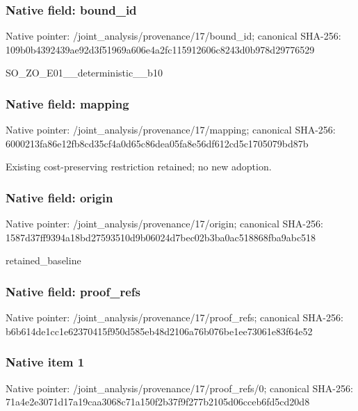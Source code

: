 \documentclass[10pt,a4paper]{article}
\begin{document}
\subsubsection{Native field: bound\_\allowbreak{}id}
Native pointer: /joint\_\allowbreak{}analysis/provenance/17/bound\_\allowbreak{}id; canonical SHA-256: 109b0b4392439ae92d3f51969a606e4a2fc115912606c8243d0b978d29776529

\begingroup\raggedright\sloppy SO\_\allowbreak{}ZO\_\allowbreak{}E01\_\allowbreak{}\_\allowbreak{}deterministic\_\allowbreak{}\_\allowbreak{}b10\par\endgroup

\subsubsection{Native field: mapping}
Native pointer: /joint\_\allowbreak{}analysis/provenance/17/mapping; canonical SHA-256: 6000213fa86e12fb8cd35cf4a0d65c86dea05fa8e56df612cd5c1705079bd87b

\begingroup\raggedright\sloppy Existing cost-preserving restriction retained;\allowbreak{} no new adoption.\par\endgroup

\subsubsection{Native field: origin}
Native pointer: /joint\_\allowbreak{}analysis/provenance/17/origin; canonical SHA-256: 1587d37ff9394a18bd27593510d9b06024d7bec02b3ba0ac518868fba9abc518

\begingroup\raggedright\sloppy retained\_\allowbreak{}baseline\par\endgroup

\subsubsection{Native field: proof\_\allowbreak{}refs}
Native pointer: /joint\_\allowbreak{}analysis/provenance/17/proof\_\allowbreak{}refs; canonical SHA-256: b6b614de1cc1e62370415f950d585eb48d2106a76b076be1ee73061e83f64e52

\subsubsection{Native item 1}
Native pointer: /joint\_\allowbreak{}analysis/provenance/17/proof\_\allowbreak{}refs/0; canonical SHA-256: 71a4e2e3071d17a19caa3068c71a150f2b37f9f277b2105d06cceb6fd5cd20d8
\end{document}
